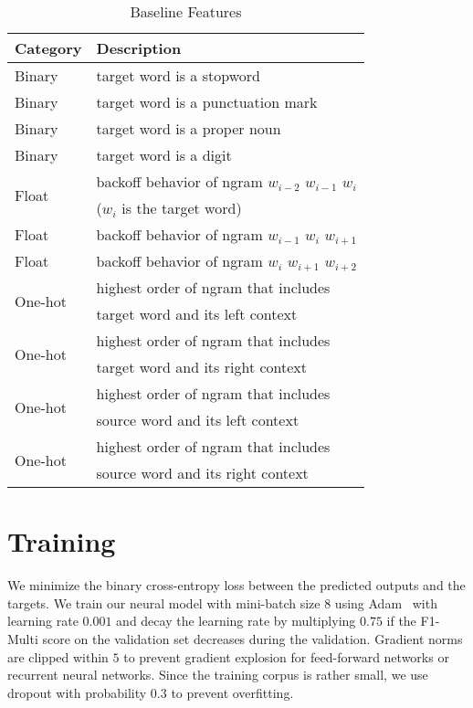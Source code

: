 \documentclass[11pt,a4paper]{article}
\begin{document}
\begin{table}
\centering
\small
\begin{tabular}{l||l} \hline
Category & Description \\  \hline
Binary & target word is a stopword \\
Binary & target word is a punctuation mark \\
Binary & target word is a proper noun \\
Binary & target word is a digit \\
\multirow{2}[0]{*}{Float} & backoff behavior of ngram $w_{i-2}$ $w_{i-1}$ $w_{i}$ \\ & ($w_{i}$ is the target word)\\
Float & backoff behavior of ngram $w_{i-1}$ $w_{i}$ $w_{i+1}$ \\
Float & backoff behavior of ngram $w_{i}$ $w_{i+1}$ $w_{i+2}$ \\
\multirow{2}[0]{*}{One-hot} & highest order of ngram that includes \\ & target word and its left context\\
\multirow{2}[0]{*}{One-hot} & highest order of ngram that includes \\ & target word and its right context\\
\multirow{2}[0]{*}{One-hot} & highest order of ngram that includes \\ & source word and its left context \\
\multirow{2}[0]{*}{One-hot} & highest order of ngram that includes \\ & source word and its right context \\ \hline
\end{tabular}
\caption{Baseline Features \label{tab:features}}
\end{table}

\section{Training}
We minimize the binary cross-entropy loss between the predicted outputs and the targets. We train our neural model with mini-batch size $8$ using Adam~\cite{kingma2014adam} with learning rate $0.001$ and decay the learning rate by multiplying $0.75$ if the F1-Multi score on the validation set decreases during the validation. Gradient norms are clipped within $5$ to prevent gradient explosion for feed-forward networks or recurrent neural networks. Since the training corpus is rather small, we use dropout \cite{srivastava2014dropout} with probability $0.3$ to prevent overfitting.
\end{document}
